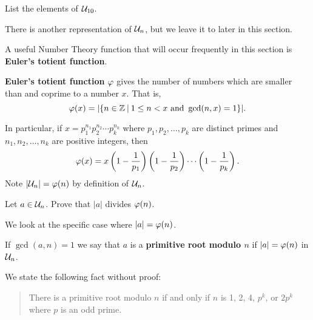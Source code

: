 \begin{exercise}
    List the elements of $\mathcal{U}_{10}$.
\end{exercise}

There is another representation of $\mathcal{U}_{n}$, but we leave it to later in this section.

A useful Number Theory function that will occur frequently in this section is \textbf{Euler's totient function}.

\newpage

\begin{definition}
    \textbf{Euler's totient function} $\varphi$ gives the number of numbers which are smaller than and coprime to a number $x$. That is,
    \[
        \totient(x) = |\{n \in \mathbb{Z} \vert 1 \leq n < x \text{ and } \gcd(n, x) = 1\}|.
    \]
\end{definition}
In particular, if $x = p_1^{n_1}p_2^{n_2}\cdots p_k^{n_k}$ where $p_1, p_2,\dots,p_k$ are distinct primes and $n_1,n_2,\dots,n_k$ are positive integers, then
\[
    \varphi(x) = x \left(1 - \frac1{p_1}\right)\left(1 - \frac1{p_2}\right)\cdots\left(1 - \frac1{p_k}\right).
\]
Note $|\mathcal{U}_{n}| = \varphi(n)$ by definition of $\mathcal{U}_{n}$.

\begin{exercise}\label{exercise-order-of-a-divides-phi-a}
    Let $a \in \mathcal{U}_{n}$. Prove that $|a|$ divides $\varphi(n)$.
\end{exercise}

We look at the specific case where $|a| = \varphi(n)$.
\begin{definition}
    If $\gcd(a, n) = 1$ we say that $a$ is a \textbf{primitive root modulo $n$} if $|a| = \varphi(n)$ in $\mathcal{U}_{n}$.
\end{definition}
We state the following fact without proof:
\begin{quote}
    There is a primitive root modulo $n$ if and only if $n$ is 1, 2, 4, $p^k$, or $2p^k$ where $p$ is an odd prime.
\end{quote}

